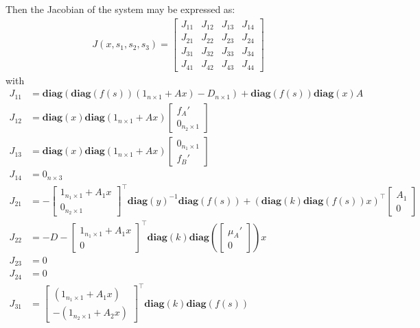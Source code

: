 \documentclass[3p,times]{elsarticle}
\newcommand{\diag}{\textbf{diag}}
\begin{document}
Then the Jacobian of the system may be expressed as:
\begin{align}
\label{Jacobian_system}
 J(x,s_1,s_2,s_3) = \begin{bmatrix}
J_{11} & J_{12} & J_{13} & J_{14} \\
J_{21} & J_{22} & J_{23} & J_{24} \\
J_{31} & J_{32} & J_{33} & J_{34} \\
J_{41} & J_{42} & J_{43} & J_{44} 
\end{bmatrix} 
\end{align} 
with 
\begin{align}
J_{11} &=  \diag(\diag(f(s))(1_{n\times 1} +Ax)-D_{n\times 1})
+\diag(f(s))\diag(x)A \\
J_{12} &= \diag(x)\diag(1_{n \times 1}+Ax)\begin{bmatrix} f_A' \\ 0_{n_2 \times 1} \end{bmatrix}  \\
J_{13} &=\diag(x)\diag(1_{n\times 1}+Ax)\begin{bmatrix} 0_{n_1 \times 1} \\ f_B' \end{bmatrix} \\
J_{14} &= 0_{n\times 3}\\
J_{21} &= -\begin{bmatrix}
1_{n_1 \times 1} + A_1 x \\ 0_{n_2 \times 1} \end{bmatrix}^\top \diag(y)^{-1} \diag (f(s))  + (\diag(k)\diag(f(s))x)^\top\begin{bmatrix} A_1 \\ 0 \end{bmatrix}  \\
J_{22} &= -D  - \begin{bmatrix} 1_{n_1 \times 1} + A_1x \\ 0 \end{bmatrix}^\top \diag(k) \diag\left( \begin{bmatrix}\mu_A' \\ 0 \end{bmatrix}\right)x \\
J_{23} & = 0 \\
J_{24} &= 0 \\
J_{31} &= \begin{bmatrix} \left(1_{n_1 \times 1}+A_1x \right)\\ - \left(1_{n_2 \times 1} + A_2x \right)  \end{bmatrix}^\top \diag(k) \diag(f(s)) 

\end{align}
\end{document}
